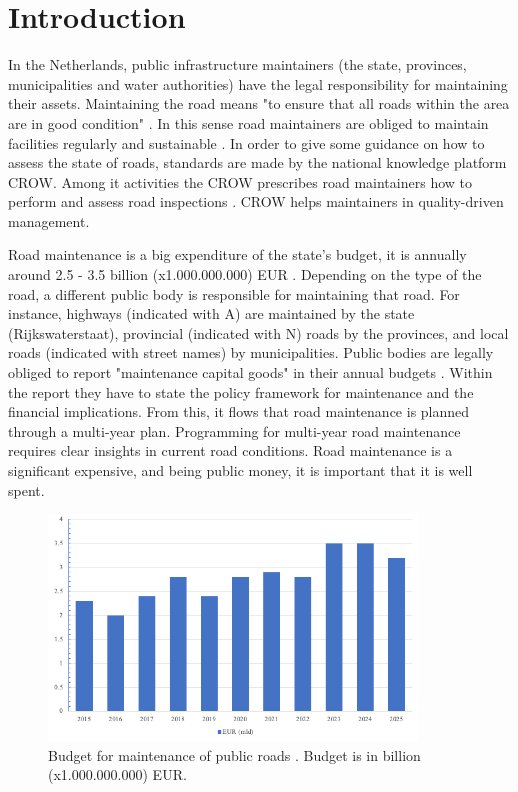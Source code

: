 \clearpage
\section{Introduction}

In the Netherlands, public infrastructure maintainers (the state, provinces, municipalities and water authorities) have the legal responsibility for maintaining their assets. Maintaining the road means "to ensure that all roads within the area are in good condition" \cite{Wegenwet} . In this sense road maintainers are obliged to maintain facilities regularly and sustainable \cite{BurgerlijkWetbook6:174}. In order to give some guidance on how to assess the state of roads, standards are made by the national knowledge platform CROW. Among it activities the CROW prescribes road maintainers how to perform and assess road inspections \cite{CROW_147}. CROW helps maintainers in quality-driven management. 

Road maintenance is a big expenditure of the state's budget, it is annually around 2.5 - 3.5 billion (x1.000.000.000) EUR \cite{Rijksbegroting:Infrastructuur}. Depending on the type of the road, a different public body is responsible for maintaining that road. For instance, highways (indicated with A) are maintained by the state (Rijkswaterstaat), provincial (indicated with N) roads by the provinces, and local roads (indicated with street names) by municipalities. Public bodies are legally obliged to report "maintenance capital goods" in their annual budgets \cite{Wet_Besluit_Begroting}. Within the report they have to state the policy framework for maintenance and the financial implications. From this, it flows that road maintenance is planned through a multi-year plan. Programming for multi-year road maintenance requires clear insights in current road conditions. Road maintenance is a significant expensive, and being public money, it is important that it is well spent. 

\begin{figure}[ht]
    \begin{center}
    \includegraphics[height=6cm]{images/1_introduction/budget.png}
    \end{center}
    \caption{Budget for maintenance of public roads \cite{Rijksbegroting:Infrastructuur}. Budget is in billion (x1.000.000.000) EUR.}
    \label{fig:prm}
\end{figure}

